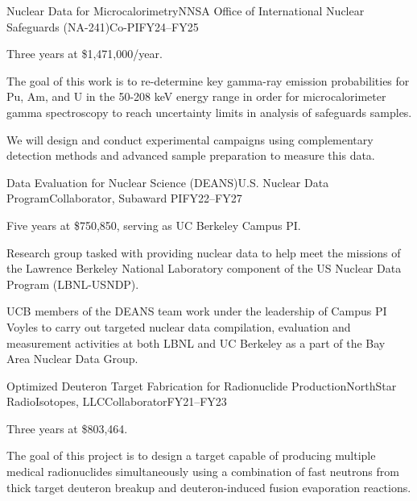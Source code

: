 \begin{rSubsection}{Nuclear Data for Microcalorimetry}{\textnormal{NNSA Office of International Nuclear Safeguards (NA-241)}}{Co-PI}{FY24--FY25}
\item    Three years at \$1,471,000/year.
\item The goal of this work is to re-determine key gamma-ray emission probabilities for Pu, Am, and U in the 50-208 keV energy range in order for microcalorimeter gamma spectroscopy to reach uncertainty limits in analysis of safeguards samples. 
\item We will design and conduct experimental campaigns using complementary detection methods and advanced sample preparation to measure this data. 


\end{rSubsection}

\begin{rSubsection}{Data Evaluation for Nuclear Science (DEANS)}{\textnormal{U.S. Nuclear Data Program}}{Collaborator, Subaward PI}{FY22--FY27}
\item    Five years at \$750,850, serving as UC Berkeley Campus PI.
\item Research group tasked with providing nuclear data to help meet the missions of the Lawrence Berkeley National Laboratory component of the US Nuclear Data Program (LBNL-USNDP). 
\item UCB members of the DEANS team work under the leadership of Campus PI Voyles to carry out targeted nuclear
data compilation, evaluation and measurement activities at both LBNL and UC Berkeley as a part of the Bay Area Nuclear Data Group. 


\end{rSubsection}



\begin{rSubsection}{Optimized Deuteron Target Fabrication for Radionuclide Production}{\textnormal{NorthStar RadioIsotopes, LLC}}{Collaborator}{FY21--FY23}
\item    Three years at \$803,464.
\item The goal of this project is to design a target capable of producing multiple medical radionuclides simultaneously using a combination of fast neutrons from thick target deuteron breakup and deuteron-induced fusion evaporation reactions.

\end{rSubsection}

